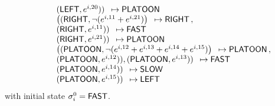 \begin{equation*}
\begin{array}{rcl}
\\
& & \begin{array}{l} (\mleft, e^{i,20})) \end{array} \mapsto \mplatoon 
\\
& & \begin{array}{l} \left((\mright, \neg (e^{i,11} + e^{i, 21})\right) \end{array} \mapsto \mright \, , \\
& & \begin{array}{l} (\mright, e^{i,11})) \end{array} \mapsto \mfast 
\\
& & \begin{array}{l} (\mright, e^{i,21})) \end{array} \mapsto \mplatoon 
\\
& & \begin{array}{l} \left((\mplatoon, \neg (e^{i,12} + e^{i, 13} + e^{i, 14} + e^{i, 15})\right) \end{array} \mapsto \mplatoon \, , \\
& & \begin{array}{l} (\mplatoon, e^{i,12})), (\mplatoon, e^{i,13})) \end{array} \mapsto \mfast \\
& & \begin{array}{l} (\mplatoon, e^{i,14})) \end{array} \mapsto \mslow \\
& & \begin{array}{l} (\mplatoon, e^{i,15})) \end{array} \mapsto \mleft \\

\end{array}
\end{equation*}
with initial state $\sigma_i^0 = \mfast$.

